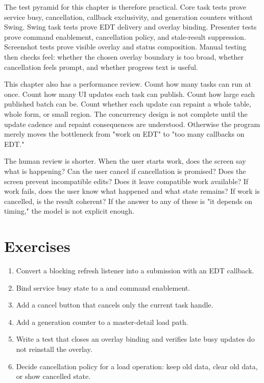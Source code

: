The test pyramid for this chapter is therefore practical. Core task tests prove
service busy, cancellation, callback exclusivity, and generation counters
without Swing. Swing task tests prove EDT delivery and overlay binding.
Presenter tests prove command enablement, cancellation policy, and stale-result
suppression. Screenshot tests prove visible overlay and status composition.
Manual testing then checks feel: whether the chosen overlay boundary is too
broad, whether cancellation feels prompt, and whether progress text is useful.

This chapter also has a performance review. Count how many tasks can run at
once. Count how many UI updates each task can publish. Count how large each
published batch can be. Count whether each update can repaint a whole table,
whole form, or small region. The concurrency design is not complete until the
update cadence and repaint consequences are understood. Otherwise the program
merely moves the bottleneck from "work on EDT" to "too many callbacks on EDT."

The human review is shorter. When the user starts work, does the screen say
what is happening? Can the user cancel if cancellation is promised? Does the
screen prevent incompatible edits? Does it leave compatible work available? If
work fails, does the user know what happened and what state remains? If work is
cancelled, is the result coherent? If the answer to any of these is "it depends
on timing," the model is not explicit enough.

\section{Exercises}

\begin{exercisebox}
\begin{enumerate}
\item Convert a blocking refresh listener into a  submission
with an EDT callback.
\item Bind service busy state to a  and command
enablement.
\item Add a cancel button that cancels only the current task handle.
\item Add a generation counter to a master-detail load path.
\item Write a test that closes an overlay binding and verifies late busy updates
do not reinstall the overlay.
\item Decide cancellation policy for a load operation: keep old data, clear old
data, or show cancelled state.
\end{enumerate}
\end{exercisebox}

